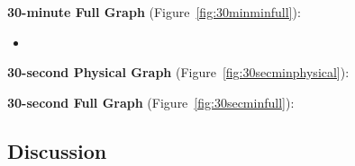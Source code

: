 \textbf{30-minute Full Graph} (Figure~\ref{fig:30minminfull}):

\begin{itemize}[noitemsep,nolistsep]
\item
\end{itemize}

\textbf{30-second Physical Graph} (Figure~\ref{fig:30secminphysical}):

\textbf{30-second Full Graph} (Figure~\ref{fig:30secminfull}):

\subsection{Discussion}
